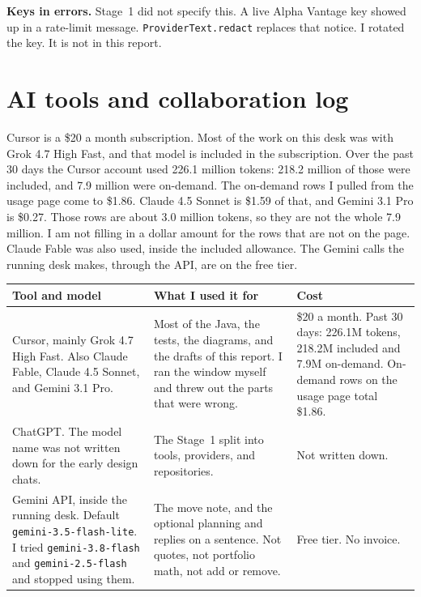 \documentclass[11pt]{article}
\begin{document}
\textbf{Keys in errors.}
Stage~1 did not specify this. A live Alpha Vantage key showed up in a rate-limit message.
\texttt{ProviderText.redact} replaces that notice. I rotated the key. It is not in this report.

\section{AI tools and collaboration log}

Cursor is a \$20 a month subscription. Most of the work on this desk was with Grok 4.7 High Fast, and that model is included in the subscription. Over the past 30 days the Cursor account used 226.1 million tokens: 218.2 million of those were included, and 7.9 million were on-demand. The on-demand rows I pulled from the usage page come to \$1.86. Claude 4.5 Sonnet is \$1.59 of that, and Gemini 3.1 Pro is \$0.27. Those rows are about 3.0 million tokens, so they are not the whole 7.9 million. I am not filling in a dollar amount for the rows that are not on the page. Claude Fable was also used, inside the included allowance. The Gemini calls the running desk makes, through the API, are on the free tier.

\begin{center}
\small
\begin{tabularx}{\textwidth}{@{}p{2.7cm}Xp{2.6cm}@{}}
\toprule
Tool and model & What I used it for & Cost \\
\midrule
Cursor, mainly Grok 4.7 High Fast. Also Claude Fable, Claude 4.5 Sonnet, and Gemini 3.1 Pro. &
Most of the Java, the tests, the diagrams, and the drafts of this report. I ran the window myself and threw out the parts that were wrong. &
\$20 a month. Past 30 days: 226.1M tokens, 218.2M included and 7.9M on-demand. On-demand rows on the usage page total \$1.86. \\
\addlinespace
ChatGPT. The model name was not written down for the early design chats. &
The Stage~1 split into tools, providers, and repositories. &
Not written down. \\
\addlinespace
Gemini API, inside the running desk. Default \texttt{gemini-3.5-flash-lite}. I tried \texttt{gemini-3.8-flash} and \texttt{gemini-2.5-flash} and stopped using them. &
The move note, and the optional planning and replies on a sentence. Not quotes, not portfolio math, not add or remove. &
Free tier. No invoice. \\
\bottomrule
\end{tabularx}
\end{center}
\end{document}
